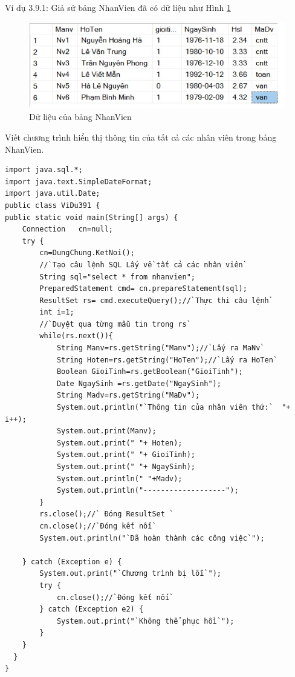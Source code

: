 Ví dụ 3.9.1: 
Giả sử bảng NhanVien đã có dữ liệu như Hình \ref{hinh35}
\begin{figure}[!ht]
	\centering
	\includegraphics[scale=0.9]{Figures//Hinh35.png}
	\caption{ Dữ liệu của bảng NhanVien }\label{hinh35} 
\end{figure}

Viết chương trình hiển thị thông tin của tất cả các nhân viên trong bảng NhanVien.
\begin{lstlisting}[escapechar=`]
import java.sql.*;
import java.text.SimpleDateFormat;
import java.util.Date;
public class ViDu391 {
public static void main(String[] args) {
	Connection   cn=null;
	try { 
		cn=DungChung.KetNoi();
	   	//`Tạo câu lệnh SQL Lấy về tất cả các nhân viên`
		String sql="select * from nhanvien";
		PreparedStatement cmd= cn.prepareStatement(sql);
		ResultSet rs= cmd.executeQuery();//`Thực thi câu lệnh`
		int i=1;
		//`Duyệt qua từng mẫu tin trong rs`
		while(rs.next()){
			String Manv=rs.getString("Manv");//`Lấy ra MaNv`
			String Hoten=rs.getString("HoTen");//`Lấy ra HoTen`
			Boolean GioiTinh=rs.getBoolean("GioiTinh");
			Date NgaySinh =rs.getDate("NgaySinh");
			String Madv=rs.getString("MaDv");
			System.out.println("`Thông tin của nhân viên thứ:`  "+ i++);
			System.out.print(Manv);
			System.out.print(" "+ Hoten);
			System.out.print(" "+ GioiTinh);
			System.out.print(" "+ NgaySinh);
			System.out.println(" "+Madv);
			System.out.println("-------------------");
		}
		rs.close();//` Đóng ResultSet `
		cn.close();//`Đóng kết nối`
		System.out.println("`Đã hoàn thành các công việc`");
	
	} catch (Exception e) {
		System.out.print("`Chương trình bị lỗi`");
		try { 
			cn.close();//`Đóng kết nối`
		} catch (Exception e2) {
			System.out.print("`Không thể phục hồi`");
		}
    }
  }
}
\end{lstlisting}

